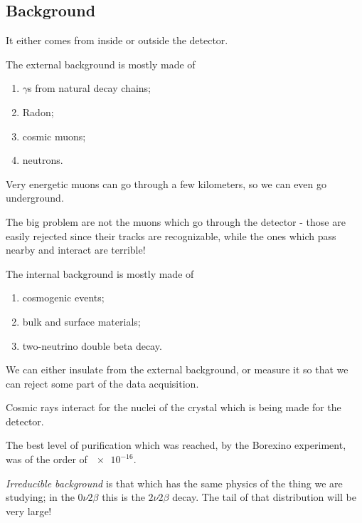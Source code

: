 \documentclass[main.tex]{subfiles}
\begin{document}
\subsection{Background}



It either comes from inside or outside the detector. 

The external background is mostly made of 
\begin{enumerate}
    \item \(\gamma \)s from natural decay chains;
    \item Radon;
    \item cosmic muons;
    \item neutrons.
\end{enumerate}

Very energetic muons can go through a few kilometers, so we can even go underground. 

The big problem are not the muons which go through the detector - 
those are easily rejected since their tracks are recognizable,
while the ones which pass nearby and interact are terrible! 

The internal background is mostly made of 
\begin{enumerate}
    \item cosmogenic events;
    \item bulk and surface materials;
    \item two-neutrino double beta decay.
\end{enumerate}

We can either insulate from the external background, or measure it so that 
we can reject some part of the data acquisition. 

Cosmic rays interact for the nuclei of the crystal which 
is being made for the detector.

The best level of purification which was reached, by the Borexino experiment, 
was of the order of \(\num{e-16}\). 

\emph{Irreducible background} is that which has the same physics
of the thing we are studying; in the \(0 \nu 2 \beta \) this is the \(2 \nu 2 \beta \) decay. 
The tail of that distribution will be very large! 
\end{document}
